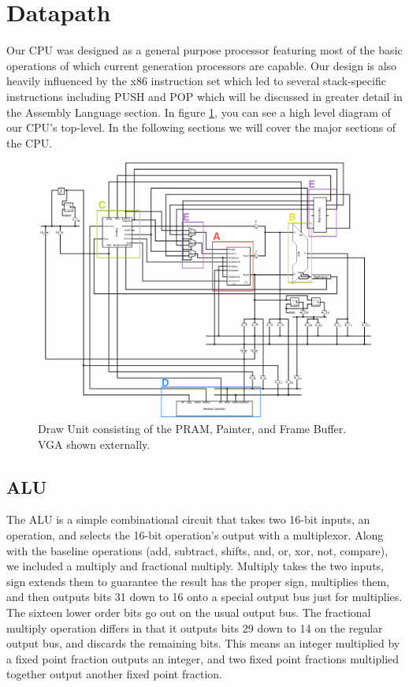\documentclass[onecolumn]{IEEEtran}
\begin{document}
\section{Datapath}
Our CPU was designed as a general purpose processor featuring most of the basic operations of which current generation processors are capable.  Our design is also heavily influenced by the x86 instruction set which led to several stack-specific instructions including PUSH and POP which will be discussed in greater detail in the Assembly Language section.  In figure \ref{fig:CPU}, you can see a high level diagram of our CPU's top-level.  In the following sections we will cover the major sections of the CPU.

\begin{figure}[H]
	\centering
	\includegraphics[width=1.0\textwidth]{Figure1.png}
	\caption{Draw Unit consisting of the PRAM, Painter, and Frame Buffer. VGA shown externally.}
	\label{fig:CPU}
\end{figure}

\subsection{ALU}
The ALU is a simple combinational circuit that takes two 16-bit inputs, an operation, and selects the 16-bit operation's output with a multiplexor.  Along with the baseline operations (add, subtract, shifts, and, or, xor, not, compare), we included a multiply and fractional multiply.  Multiply takes the two inputs, sign extends them to guarantee the result has the proper sign, multiplies them, and then outputs bits 31 down to 16 onto a special output bus just for multiplies.  The sixteen lower order bits go out on the usual output bus.  The fractional multiply operation differs in that it outputs bits 29 down to 14 on the regular output bus, and discards the remaining bits.  This means an integer multiplied by a fixed point fraction outputs an integer, and two fixed point fractions multiplied together output another fixed point fraction.
\end{document}

